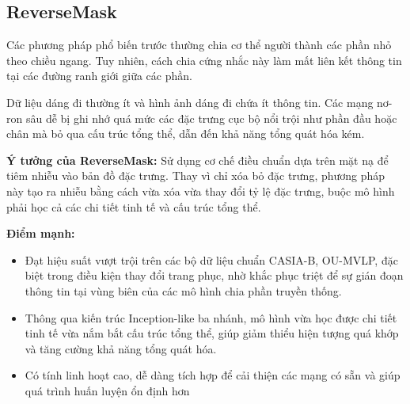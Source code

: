 
\subsection{ReverseMask\cite{shen2022gaitrecognitionmaskbasedregularization}}

Các phương pháp phổ biến trước thường chia cơ thể người thành các phần nhỏ theo chiều ngang. Tuy nhiên, cách chia cứng nhắc này làm mất liên kết thông tin tại các đường ranh giới giữa các phần.

Dữ liệu dáng đi thường ít và hình ảnh dáng đi chứa ít thông tin. Các mạng nơ-ron sâu dễ bị ghi nhớ quá mức các đặc trưng cục bộ nổi trội như phần đầu hoặc chân mà bỏ qua cấu trúc tổng thể, dẫn đến khả năng tổng quát hóa kém.

\textbf{Ý tưởng của ReverseMask:}
Sử dụng cơ chế điều chuẩn dựa trên mặt nạ để tiêm nhiễu vào bản đồ đặc trưng. Thay vì chỉ xóa bỏ đặc trưng, phương pháp này tạo ra nhiễu bằng cách vừa xóa vừa thay đổi tỷ lệ đặc trưng, buộc mô hình phải học cả các chi tiết tinh tế và cấu trúc tổng thể.



\textbf{Điểm mạnh:}
\begin{itemize}
  \item Đạt hiệu suất vượt trội trên các bộ dữ liệu chuẩn CASIA-B, OU-MVLP, đặc biệt trong điều kiện thay đổi trang phục, nhờ khắc phục triệt để sự gián đoạn thông tin tại vùng biên của các mô hình chia phần truyền thống.
  \item Thông qua kiến trúc Inception-like ba nhánh, mô hình vừa học được chi tiết tinh tế vừa nắm bắt cấu trúc tổng thể, giúp giảm thiểu hiện tượng quá khớp và tăng cường khả năng tổng quát hóa.
  \item Có tính linh hoạt cao, dễ dàng tích hợp để cải thiện các mạng có sẵn và giúp quá trình huấn luyện ổn định hơn
\end{itemize}

